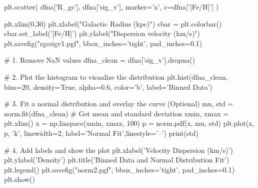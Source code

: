 \documentclass{article}
\begin{document}
\newpage

\begin{python}
plt.scatter(
    dfna['R_gc'],
    dfna['sig_v'],
    marker='x',
    c=dfna['[Fe/H]']
)

plt.xlim(0,30)
plt.xlabel("Galactic Radius (kpc)")
cbar = plt.colorbar()
cbar.set_label('[Fe/H]')
plt.ylabel("Dispersion velocity (km/s)")
plt.savefig("rgcsigv1.pgf", bbox_inches='tight', pad_inches=0.1)
\end{python}

\begin{python}
# 1. Remove NaN values
dfna_clean = dfna['sig_v'].dropna()

# 2. Plot the histogram to visualize the distribution
plt.hist(dfna_clean, bins=20, density=True, alpha=0.6, color='b', label='Binned Data')

# 3. Fit a normal distribution and overlay the curve (Optional)
mu, std = norm.fit(dfna_clean)  # Get mean and standard deviation
xmin, xmax = plt.xlim()
x = np.linspace(xmin, xmax, 100)
p = norm.pdf(x, mu, std)
plt.plot(x, p, 'k', linewidth=2, label='Normal Fit',linestyle='--')
print(std)

# 4. Add labels and show the plot
plt.xlabel('Velocity Dispersion (km/s)')
plt.ylabel('Density')
plt.title('Binned Data and Normal Distribution Fit')
plt.legend()
plt.savefig("norm2.pgf", bbox_inches='tight', pad_inches=0.1)
plt.show()
\end{python}
\end{document}
